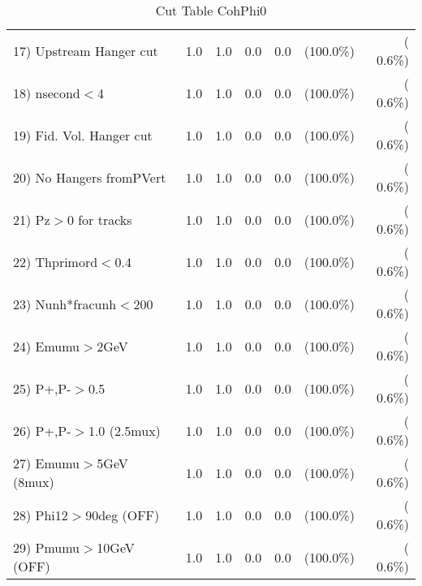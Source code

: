 \begin{table}[h!]
\begin{tabular}{||l||r|r|r|r|r|r||}
 17) Upstream Hanger cut  &          1.0 &          1.0 &          0.0 &          0.0 & (100.0\%) & (  0.6\%) \\
 18) nsecond$<$4          &          1.0 &          1.0 &          0.0 &          0.0 & (100.0\%) & (  0.6\%) \\
 19) Fid. Vol. Hanger cut &          1.0 &          1.0 &          0.0 &          0.0 & (100.0\%) & (  0.6\%) \\
 20) No Hangers fromPVert &          1.0 &          1.0 &          0.0 &          0.0 & (100.0\%) & (  0.6\%) \\
 21) Pz$>$0 for tracks    &          1.0 &          1.0 &          0.0 &          0.0 & (100.0\%) & (  0.6\%) \\
 22) Thprimord$<$0.4      &          1.0 &          1.0 &          0.0 &          0.0 & (100.0\%) & (  0.6\%) \\
 23) Nunh*fracunh$<$200   &          1.0 &          1.0 &          0.0 &          0.0 & (100.0\%) & (  0.6\%) \\
 24) Emumu$>$2GeV         &          1.0 &          1.0 &          0.0 &          0.0 & (100.0\%) & (  0.6\%) \\
 25) P+,P-$>$0.5          &          1.0 &          1.0 &          0.0 &          0.0 & (100.0\%) & (  0.6\%) \\
 26) P+,P-$>$1.0 (2.5mux) &          1.0 &          1.0 &          0.0 &          0.0 & (100.0\%) & (  0.6\%) \\
 27) Emumu$>$5GeV  (8mux) &          1.0 &          1.0 &          0.0 &          0.0 & (100.0\%) & (  0.6\%) \\
 28) Phi12$>$90deg  (OFF) &          1.0 &          1.0 &          0.0 &          0.0 & (100.0\%) & (  0.6\%) \\
 29) Pmumu$>$10GeV  (OFF) &          1.0 &          1.0 &          0.0 &          0.0 & (100.0\%) & (  0.6\%) \\
 \hline
 \hline
 \end{tabular}
 \caption{Cut Table  CohPhi0  }
 \label{tab-cutcohjpsi-mumu_cohphi0}
 \end{table}

